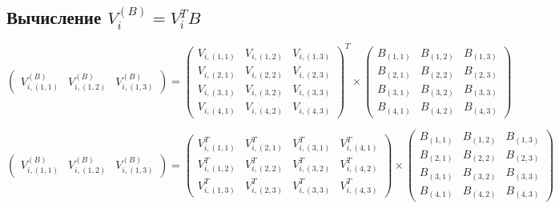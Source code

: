 \subsection{Вычисление $V_i^{(B)} = V_i^T B$}

$$
	\begin{pmatrix}
		V_{i,(1,1)}^{(B)} & V_{i,(1,2)}^{(B)} & V_{i,(1,3)}^{(B)}
	\end{pmatrix}
	=
	\begin{pmatrix}
		V_{i,(1,1)} & V_{i,(1,2)} & V_{i,(1,3)} \\
		V_{i,(2,1)} & V_{i,(2,2)} & V_{i,(2,3)} \\
		V_{i,(3,1)} & V_{i,(3,2)} & V_{i,(3,3)} \\
		V_{i,(4,1)} & V_{i,(4,2)} & V_{i,(4,3)}
	\end{pmatrix}^T
	\times
	\begin{pmatrix}
		B_{(1,1)} & B_{(1,2)} & B_{(1,3)} \\
		B_{(2,1)} & B_{(2,2)} & B_{(2,3)} \\
		B_{(3,1)} & B_{(3,2)} & B_{(3,3)} \\
		B_{(4,1)} & B_{(4,2)} & B_{(4,3)}
	\end{pmatrix}
$$

$$
	\begin{pmatrix}
		V_{i,(1,1)}^{(B)} & V_{i,(1,2)}^{(B)} & V_{i,(1,3)}^{(B)}
	\end{pmatrix}
	=
	\begin{pmatrix}
		V_{i,(1,1)}^T & V_{i,(2,1)}^T & V_{i,(3,1)}^T & V_{i,(4,1)}^T \\
		V_{i,(1,2)}^T & V_{i,(2,2)}^T & V_{i,(3,2)}^T & V_{i,(4,2)}^T \\
		V_{i,(1,3)}^T & V_{i,(2,3)}^T & V_{i,(3,3)}^T & V_{i,(4,3)}^T
	\end{pmatrix}
	\times
	\begin{pmatrix}
		B_{(1,1)} & B_{(1,2)} & B_{(1,3)} \\
		B_{(2,1)} & B_{(2,2)} & B_{(2,3)} \\
		B_{(3,1)} & B_{(3,2)} & B_{(3,3)} \\
		B_{(4,1)} & B_{(4,2)} & B_{(4,3)}
	\end{pmatrix}
$$

